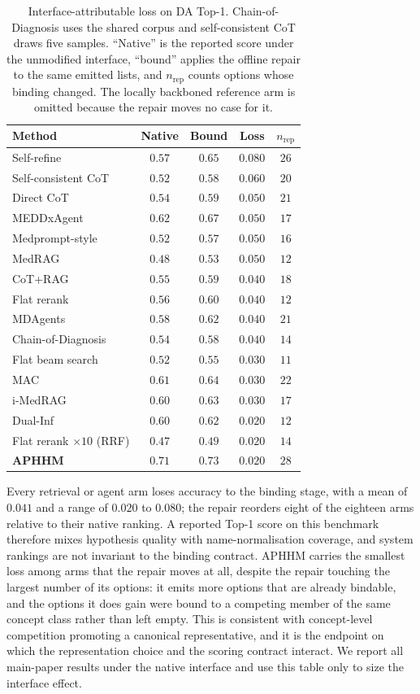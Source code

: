\documentclass[letterpaper]{article}
\begin{document}
\begin{table}[tb]
\centering
\footnotesize
\setlength{\tabcolsep}{3pt}
\begin{tabular}{@{}lcccc@{}}
\toprule
Method & Native & Bound & Loss & $n_{\mathrm{rep}}$ \\
\midrule
Self-refine & $0.57$ & $0.65$ & $0.080$ & $26$ \\
Self-consistent CoT & $0.52$ & $0.58$ & $0.060$ & $20$ \\
Direct CoT & $0.54$ & $0.59$ & $0.050$ & $21$ \\
MEDDxAgent & $0.62$ & $0.67$ & $0.050$ & $17$ \\
Medprompt-style & $0.52$ & $0.57$ & $0.050$ & $16$ \\
MedRAG & $0.48$ & $0.53$ & $0.050$ & $12$ \\
CoT+RAG & $0.55$ & $0.59$ & $0.040$ & $18$ \\
Flat rerank & $0.56$ & $0.60$ & $0.040$ & $12$ \\
MDAgents & $0.58$ & $0.62$ & $0.040$ & $21$ \\
Chain-of-Diagnosis & $0.54$ & $0.58$ & $0.040$ & $14$ \\
Flat beam search & $0.52$ & $0.55$ & $0.030$ & $11$ \\
MAC & $0.61$ & $0.64$ & $0.030$ & $22$ \\
i-MedRAG & $0.60$ & $0.63$ & $0.030$ & $17$ \\
Dual-Inf & $0.60$ & $0.62$ & $0.020$ & $12$ \\
Flat rerank $\times 10$ (RRF) & $0.47$ & $0.49$ & $0.020$ & $14$ \\
\textbf{APHHM} & $\mathbf{0.71}$ & $0.73$ & $\mathbf{0.020}$ & $28$ \\
\bottomrule
\end{tabular}
\caption{Interface-attributable loss on DA Top-1. Chain-of-Diagnosis uses the shared corpus and self-consistent CoT draws five samples. ``Native'' is the reported score under the unmodified interface, ``bound'' applies the offline repair to the same emitted lists, and $n_{\mathrm{rep}}$ counts options whose binding changed. The locally backboned reference arm is omitted because the repair moves no case for it.}
\label{tab:ial}
\end{table}

Every retrieval or agent arm loses accuracy to the binding stage, with a mean of $0.041$ and a range of $0.020$ to $0.080$; the repair reorders eight of the eighteen arms relative to their native ranking.
A reported Top-1 score on this benchmark therefore mixes hypothesis quality with name-normalisation coverage, and system rankings are not invariant to the binding contract.
APHHM carries the smallest loss among arms that the repair moves at all, despite the repair touching the largest number of its options: it emits more options that are already bindable, and the options it does gain were bound to a competing member of the same concept class rather than left empty.
This is consistent with concept-level competition promoting a canonical representative, and it is the endpoint on which the representation choice and the scoring contract interact.
We report all main-paper results under the native interface and use this table only to size the interface effect.
\end{document}

